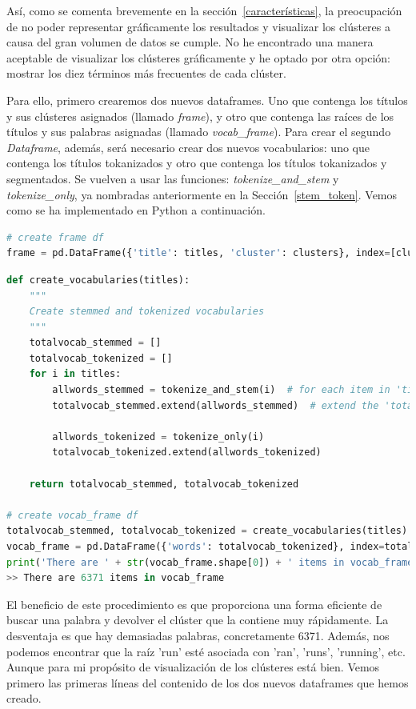 \documentclass{uimppracticas}
\begin{document}
Así, como se comenta brevemente en la sección~\ref{características}, la preocupación de no poder representar gráficamente los resultados y visualizar los clústeres a causa del gran volumen de datos se cumple. No he encontrado una manera aceptable de visualizar los clústeres gráficamente y he optado por otra opción: mostrar los diez términos más frecuentes de cada clúster.

Para ello, primero crearemos dos nuevos dataframes. Uno que contenga los títulos y sus clústeres asignados (llamado \textit{frame}), y otro que contenga las raíces de los títulos y sus palabras asignadas (llamado \textit{vocab\_frame}). Para crear el segundo \textit{Dataframe}, además, será necesario crear dos nuevos vocabularios: uno que contenga los títulos tokanizados y otro que contenga los títulos tokanizados y segmentados. Se vuelven a usar las funciones: \textit{tokenize\_and\_stem} y \textit{tokenize\_only}, ya nombradas anteriormente en la Sección~\ref{stem_token}. Vemos como se ha implementado en Python a continuación.

\begin{lstlisting}[language=python, basicstyle=\small]
# create frame df
frame = pd.DataFrame({'title': titles, 'cluster': clusters}, index=[clusters], columns=['title', 'cluster'])
\end{lstlisting}

\begin{lstlisting}[language=python, basicstyle=\small]
def create_vocabularies(titles):
	"""
	Create stemmed and tokenized vocabularies
	"""
	totalvocab_stemmed = []
	totalvocab_tokenized = []
	for i in titles:
		allwords_stemmed = tokenize_and_stem(i)  # for each item in 'titles', tokenize/stem
		totalvocab_stemmed.extend(allwords_stemmed)  # extend the 'totalvocab_stemmed' list
	
		allwords_tokenized = tokenize_only(i)
		totalvocab_tokenized.extend(allwords_tokenized)
	
	return totalvocab_stemmed, totalvocab_tokenized

# create vocab_frame df
totalvocab_stemmed, totalvocab_tokenized = create_vocabularies(titles)
vocab_frame = pd.DataFrame({'words': totalvocab_tokenized}, index=totalvocab_stemmed)
print('There are ' + str(vocab_frame.shape[0]) + ' items in vocab_frame')
>> There are 6371 items in vocab_frame
\end{lstlisting}

El beneficio de este procedimiento es que proporciona una forma eficiente de buscar una palabra y devolver el clúster que la contiene muy rápidamente. La desventaja es que hay demasiadas palabras, concretamente 6371. Además, nos podemos encontrar que la raíz 'run' esté asociada con 'ran', 'runs', 'running', etc. Aunque para mi propósito de visualización de los clústeres está bien. Vemos primero las primeras líneas del contenido de los dos nuevos dataframes que hemos creado.
\end{document}
